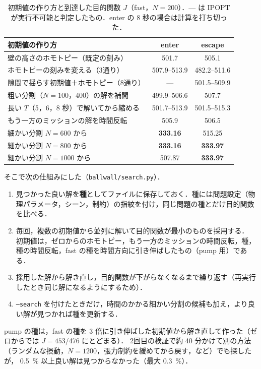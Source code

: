 \documentclass[a4paper,10pt]{ltjsarticle}
\newcommand{\code}[1]{\texttt{#1}}
\begin{document}
\begin{table}[tbp]
  \centering
  \caption{初期値の作り方と到達した目的関数 $J$（fast，$N=200$）．— は IPOPT が実行不可能と判定したもの．enter の 8 秒の場合は計算を打ち切った．}
  \label{tab:multistart}
  \begin{tabular}{lcc}
    \toprule
    初期値の作り方 & enter & escape \\
    \midrule
    壁の高さのホモトピー（既定の刻み） & 501.7 & 505.1 \\
    ホモトピーの刻みを変える（3通り） & 507.9--513.9 & 482.2--511.6 \\
    隙間で揺らす初期値＋ホモトピー（8通り） & — & 501.5--509.9 \\
    粗い分割（$N=100$，400）の解を補間 & 499.9--506.6 & 507.7 \\
    長い $T$（5，6，8 秒）で解いてから縮める & 501.7--513.9 & 501.5--515.3 \\
    もう一方のミッションの解を時間反転 & 505.9 & 506.5 \\
    細かい分割 $N=600$ から & \textbf{333.16} & 515.25 \\
    細かい分割 $N=800$ から & \textbf{333.16} & \textbf{333.97} \\
    細かい分割 $N=1000$ から & 507.87 & \textbf{333.97} \\
    \bottomrule
  \end{tabular}
\end{table}

そこで次の仕組みにした（\code{ballwall/search.py}）．
\begin{enumerate}
  \item 見つかった良い解を\textbf{種}としてファイルに保存しておく．種には問題設定（物理パラメータ，シーン，制約）の指紋を付け，同じ問題の種とだけ目的関数を比べる．
  \item 毎回，複数の初期値から並列に解いて目的関数が最小のものを採用する．
        初期値は，ゼロからのホモトピー，もう一方のミッションの時間反転，種，種の時間反転，fast の種を時間方向に引き伸ばしたもの（pump 用）である．
  \item 採用した解から解き直し，目的関数が下がらなくなるまで繰り返す（再実行したとき同じ解になるようにするため）．
  \item \code{--search} を付けたときだけ，時間のかかる細かい分割の候補も加え，より良い解が見つかれば種を更新する．
\end{enumerate}
pump の種は，fast の種を 3 倍に引き伸ばした初期値から解き直して作った（ゼロからでは $J=453$/476 にとどまる）．
2回目の検証で約 40 分かけて別の方法（ランダムな摂動，$N=1200$，張力制約を緩めてから戻す，など）でも探したが，
\SI{0.5}{\%} 以上良い解は見つからなかった（最大 \SI{0.3}{\%}）．
\end{document}
